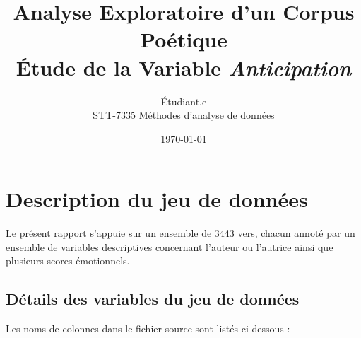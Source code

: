 \documentclass[12pt,a4paper]{article}
\title{\textbf{Analyse Exploratoire d'un Corpus Poétique \\
		Étude de la Variable \emph{Anticipation}}}
\author{Étudiant.e \\
	\small{STT-7335 Méthodes d'analyse de données}}
\date{\today}
\begin{document}
	\maketitle
	\tableofcontents
	
	\section{Description du jeu de données}
	Le présent rapport s’appuie sur un ensemble de 3443 vers, chacun annoté par un ensemble
	de variables descriptives concernant l’auteur ou l’autrice ainsi que plusieurs scores émotionnels.
	
	\subsection{Détails des variables du jeu de données}
	Les noms de colonnes dans le fichier source sont listés ci-dessous :
	
\end{document}
